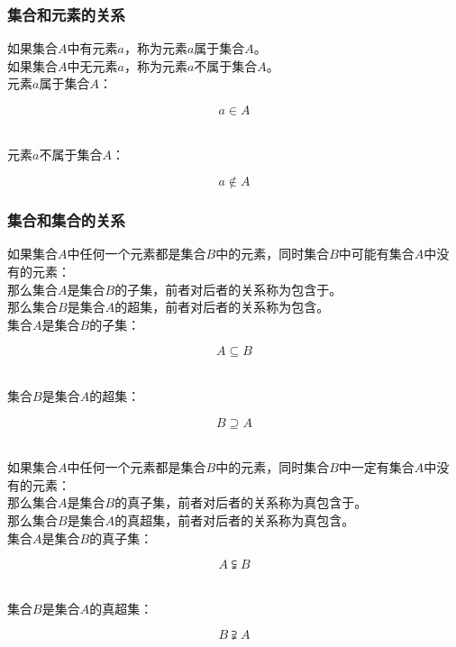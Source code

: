 \documentclass[UTF8]{ctexart}
\begin{document}
\newpage

\subsubsection{集合和元素的关系}
    如果集合$A$中有元素$a$，称为元素$a$属于集合$A$。\\[3mm]
    如果集合$A$中无元素$a$，称为元素$a$不属于集合$A$。\\[5mm]
    元素$a$属于集合$A$：
    \begin{large}
        \begin{equation*}
            a\in A
        \end{equation*}
    \end{large}\\
    元素$a$不属于集合$A$：
    \begin{large}
        \begin{equation*}
            a\notin A
        \end{equation*}
    \end{large}

\subsubsection{集合和集合的关系}
    如果集合$A$中任何一个元素都是集合$B$中的元素，同时集合$B$中可能有集合$A$中没有的元素：\\[3mm]
    那么集合$A$是集合$B$的子集，前者对后者的关系称为包含于。\\[3mm]
    那么集合$B$是集合$A$的超集，前者对后者的关系称为包含。\\[4mm]
    集合$A$是集合$B$的子集：
    \begin{large}
        \begin{equation*}
            A\subseteq B
        \end{equation*}
    \end{large}\\
    集合$B$是集合$A$的超集：
    \begin{large}
        \begin{equation*}
            B\supseteq A
        \end{equation*}
    \end{large}\\
    如果集合$A$中任何一个元素都是集合$B$中的元素，同时集合$B$中一定有集合$A$中没有的元素：\\[3mm]
    那么集合$A$是集合$B$的真子集，前者对后者的关系称为真包含于。\\[3mm]
    那么集合$B$是集合$A$的真超集，前者对后者的关系称为真包含。\\[4mm]
    集合$A$是集合$B$的真子集：
    \begin{large}
        \begin{equation*}
            A\subsetneqq B
        \end{equation*}
    \end{large}\\
    集合$B$是集合$A$的真超集：
    \begin{large}
        \begin{equation*}
            B\supsetneqq A
        \end{equation*}
    \end{large}
\end{document}
